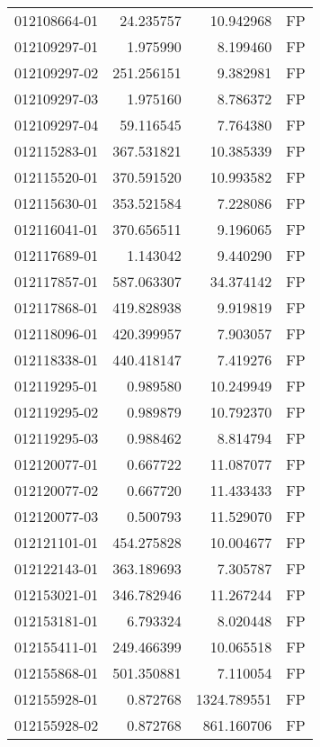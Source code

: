 \begin{tabular}{lrrl}
012108664-01 &   24.235757 &      10.942968 &   FP \\
012109297-01 &    1.975990 &       8.199460 &   FP \\
012109297-02 &  251.256151 &       9.382981 &   FP \\
012109297-03 &    1.975160 &       8.786372 &   FP \\
012109297-04 &   59.116545 &       7.764380 &   FP \\
012115283-01 &  367.531821 &      10.385339 &   FP \\
012115520-01 &  370.591520 &      10.993582 &   FP \\
012115630-01 &  353.521584 &       7.228086 &   FP \\
012116041-01 &  370.656511 &       9.196065 &   FP \\
012117689-01 &    1.143042 &       9.440290 &   FP \\
012117857-01 &  587.063307 &      34.374142 &   FP \\
012117868-01 &  419.828938 &       9.919819 &   FP \\
012118096-01 &  420.399957 &       7.903057 &   FP \\
012118338-01 &  440.418147 &       7.419276 &   FP \\
012119295-01 &    0.989580 &      10.249949 &   FP \\
012119295-02 &    0.989879 &      10.792370 &   FP \\
012119295-03 &    0.988462 &       8.814794 &   FP \\
012120077-01 &    0.667722 &      11.087077 &   FP \\
012120077-02 &    0.667720 &      11.433433 &   FP \\
012120077-03 &    0.500793 &      11.529070 &   FP \\
012121101-01 &  454.275828 &      10.004677 &   FP \\
012122143-01 &  363.189693 &       7.305787 &   FP \\
012153021-01 &  346.782946 &      11.267244 &   FP \\
012153181-01 &    6.793324 &       8.020448 &   FP \\
012155411-01 &  249.466399 &      10.065518 &   FP \\
012155868-01 &  501.350881 &       7.110054 &   FP \\
012155928-01 &    0.872768 &    1324.789551 &   FP \\
012155928-02 &    0.872768 &     861.160706 &   FP \\

\end{tabular}
